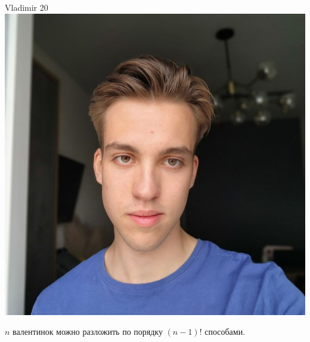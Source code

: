 \documentclass[12pt]{article}
\begin{document}
\begin{minipage}{0.45\textwidth}
\begin{tinderm}{Vladimir 20}
\includegraphics[width=\textwidth]{tinder-photo/vladimir.jpg}

  
\begin{mybox}
$n$ валентинок можно разложить по порядку $(n-1)!$ способами.
\end{mybox}
\end{tinderm}
\end{minipage}
\end{document}
